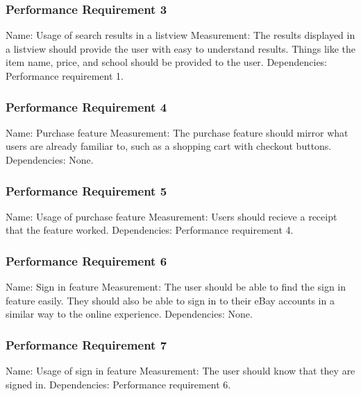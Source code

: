 \documentclass[journal,compsoc, 10pt, draftclsnofoot, onecolumn]{IEEEtran}
\begin{document}
\subsubsection{Performance Requirement 3}
Name: Usage of search results in a listview\newline
Measurement: The results displayed in a listview should provide the user with 
easy to understand results. Things like the item name, price, and school should 
be provided to the user.\newline
Dependencies: Performance requirement 1.

\subsubsection{Performance Requirement 4}
Name: Purchase feature\newline
Measurement: The purchase feature should mirror what users are already familiar 
to, such as a shopping cart with checkout buttons.\newline
Dependencies: None.

\subsubsection{Performance Requirement 5}
Name: Usage of purchase feature\newline
Measurement: Users should recieve a receipt that the feature worked.\newline 
Dependencies: Performance requirement 4.

\subsubsection{Performance Requirement 6}
Name: Sign in feature\newline
Measurement: The user should be able to find the sign in feature easily. They 
should also be able to sign in to their eBay accounts in a similar way to the 
online experience. \newline
Dependencies: None.

\subsubsection{Performance Requirement 7}
Name: Usage of sign in feature\newline
Measurement: The user should know that they are signed in. \newline
Dependencies: Performance requirement 6.
\end{document}
